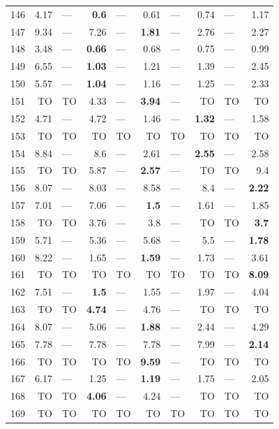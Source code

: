 \begin{longtable}{lr@{\hskip 4pt}l@{\hskip 12pt}r@{\hskip 4pt}l@{\hskip 12pt}r@{\hskip 4pt}l@{\hskip 12pt}r@{\hskip 4pt}l@{\hskip 12pt}r}
146 & 4.17 & --- & \textbf{0.6} & --- & 0.61 & --- & 0.74 & --- & 1.17 \\
147 & 9.34 & --- & 7.26 & --- & \textbf{1.81} & --- & 2.76 & --- & 2.27 \\
148 & 3.48 & --- & \textbf{0.66} & --- & 0.68 & --- & 0.75 & --- & 0.99 \\
149 & 6.55 & --- & \textbf{1.03} & --- & 1.21 & --- & 1.39 & --- & 2.45 \\
150 & 5.57 & --- & \textbf{1.04} & --- & 1.16 & --- & 1.25 & --- & 2.33 \\
151 & TO & TO & 4.33 & --- & \textbf{3.94} & --- & TO & TO & TO \\
152 & 4.71 & --- & 4.72 & --- & 1.46 & --- & \textbf{1.32} & --- & 1.58 \\
153 & TO & TO & TO & TO & TO & TO & TO & TO & TO \\
154 & 8.84 & --- & 8.6 & --- & 2.61 & --- & \textbf{2.55} & --- & 2.58 \\
155 & TO & TO & 5.87 & --- & \textbf{2.57} & --- & TO & TO & 9.4 \\
156 & 8.07 & --- & 8.03 & --- & 8.58 & --- & 8.4 & --- & \textbf{2.22} \\
157 & 7.01 & --- & 7.06 & --- & \textbf{1.5} & --- & 1.61 & --- & 1.85 \\
158 & TO & TO & 3.76 & --- & 3.8 & --- & TO & TO & \textbf{3.7} \\
159 & 5.71 & --- & 5.36 & --- & 5.68 & --- & 5.5 & --- & \textbf{1.78} \\
160 & 8.22 & --- & 1.65 & --- & \textbf{1.59} & --- & 1.73 & --- & 3.61 \\
161 & TO & TO & TO & TO & TO & TO & TO & TO & \textbf{8.09} \\
162 & 7.51 & --- & \textbf{1.5} & --- & 1.55 & --- & 1.97 & --- & 4.04 \\
163 & TO & TO & \textbf{4.74} & --- & 4.76 & --- & TO & TO & TO \\
164 & 8.07 & --- & 5.06 & --- & \textbf{1.88} & --- & 2.44 & --- & 4.29 \\
165 & 7.78 & --- & 7.78 & --- & 7.78 & --- & 7.99 & --- & \textbf{2.14} \\
166 & TO & TO & TO & TO & \textbf{9.59} & --- & TO & TO & TO \\
167 & 6.17 & --- & 1.25 & --- & \textbf{1.19} & --- & 1.75 & --- & 2.05 \\
168 & TO & TO & \textbf{4.06} & --- & 4.24 & --- & TO & TO & TO \\
169 & TO & TO & TO & TO & TO & TO & TO & TO & TO \\

\end{longtable}
